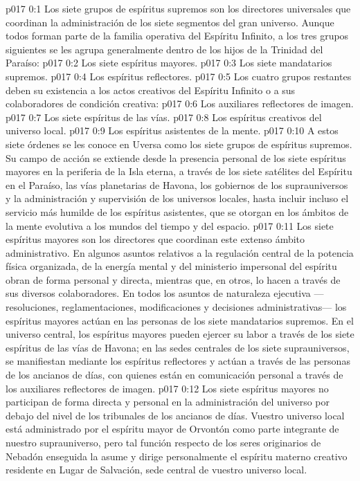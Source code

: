 \author{Consejero divino}
\vs p017 0:1 Los siete grupos de espíritus supremos son los directores universales que coordinan la administración de los siete segmentos del gran universo. Aunque todos forman parte de la familia operativa del Espíritu Infinito, a los tres grupos siguientes se les agrupa generalmente dentro de los hijos de la Trinidad del Paraíso:
\vs p017 0:2 Los siete espíritus mayores.
\vs p017 0:3 Los siete mandatarios supremos.
\vs p017 0:4 Los espíritus reflectores.
\vs p017 0:5 \pc Los cuatro grupos restantes deben su existencia a los actos creativos del Espíritu Infinito o a sus colaboradores de condición creativa:
\vs p017 0:6 Los auxiliares reflectores de imagen.
\vs p017 0:7 Los siete espíritus de las vías.
\vs p017 0:8 Los espíritus creativos del universo local.
\vs p017 0:9 Los espíritus asistentes de la mente.
\vs p017 0:10 \pc A estos siete órdenes se les conoce en Uversa como los siete grupos de espíritus supremos. Su campo de acción se extiende desde la presencia personal de los siete espíritus mayores en la periferia de la Isla eterna, a través de los siete satélites del Espíritu en el Paraíso, las vías planetarias de Havona, los gobiernos de los suprauniversos y la administración y supervisión de los universos locales, hasta incluir incluso el servicio más humilde de los espíritus asistentes, que se otorgan en los ámbitos de la mente evolutiva a los mundos del tiempo y del espacio.
\vs p017 0:11 Los siete espíritus mayores son los directores que coordinan este extenso ámbito administrativo. En algunos asuntos relativos a la regulación central de la potencia física organizada, de la energía mental y del ministerio impersonal del espíritu obran de forma personal y directa, mientras que, en otros, lo hacen a través de sus diversos colaboradores. En todos los asuntos de naturaleza ejecutiva ---resoluciones, reglamentaciones, modificaciones y decisiones administrativas--- los espíritus mayores actúan en las personas de los siete mandatarios supremos. En el universo central, los espíritus mayores pueden ejercer su labor a través de los siete espíritus de las vías de Havona; en las sedes centrales de los siete suprauniversos, se manifiestan mediante los espíritus reflectores y actúan a través de las personas de los ancianos de días, con quienes están en comunicación personal a través de los auxiliares reflectores de imagen.
\vs p017 0:12 Los siete espíritus mayores no participan de forma directa y personal en la administración del universo por debajo del nivel de los tribunales de los ancianos de días. Vuestro universo local está administrado por el espíritu mayor de Orvontón como parte integrante de nuestro suprauniverso, pero tal función respecto de los seres originarios de Nebadón enseguida la asume y dirige personalmente el espíritu materno creativo residente en Lugar de Salvación, sede central de vuestro universo local.
